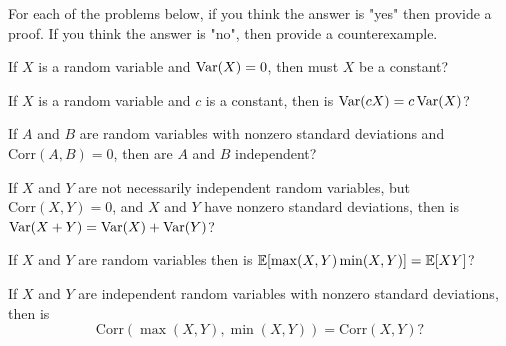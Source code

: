 \documentclass[11pt]{article}
\begin{document}
For each of the problems below, if you think the answer is "yes" then provide a 
proof. If you think the answer is "no", then provide a counterexample.

\begin{Parts}[resume]
	
	\Part If $X$ is a random variable and $\operatorname{Var} (X) = 0$, then must $X$ be a 
	constant?

	\Part If $X$ is a random variable and $c$ is a constant, then is $\operatorname{Var}(cX) 
	= c \operatorname{Var}(X)$?
	
	\Part If $A$ and $B$ are random variables with nonzero standard deviations 
	and $\text{Corr} (A, B) = 0$, then are $A$ and $B$ independent?

	\Part If $X$ and $Y$ are not necessarily independent random variables, but 
	$\text{Corr} (X, Y) = 0$, and $X$ and $Y$ have nonzero standard deviations,
	then is $\operatorname{Var} (X+Y) = \operatorname{Var}(X) + \operatorname{Var}(Y)$?
	
	\Part If $X$ and $Y$ are random variables then is $\operatorname{\mathbb{E}}[\max (X, Y) \min (X, 
	Y)] = \operatorname{\mathbb{E}}[X Y]$?
	
	\Part If $X$ and $Y$ are independent random variables with nonzero standard 
	deviations, then is $$\text{Corr}(\max(X, Y), \min(X, Y)) = \text{Corr}(X, 
	Y)?$$
	
\end{Parts}
\end{document}
